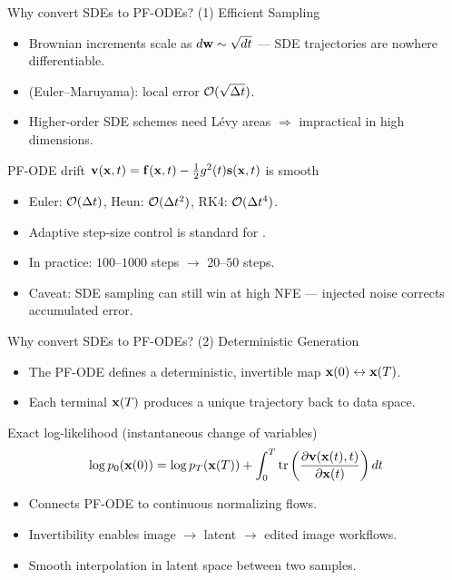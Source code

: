 \documentclass{beamer}
\begin{document}
\begin{frame}{Why convert SDEs to PF-ODEs? (1) Efficient Sampling}
	\begin{itemize}
		\item Brownian increments scale as $d\mathbf{w} \sim \sqrt{dt}$ — SDE trajectories are nowhere differentiable.
		\item \SDESolve (Euler–Maruyama): local error $\mathcal{O}(\sqrt{\Delta t})$.
		\item Higher-order SDE schemes need Lévy areas $\Rightarrow$ impractical in high dimensions.
	\end{itemize}
	\eqpause
	\begin{block}{PF-ODE drift $\mathbf{v}(\mathbf{x}, t) = \mathbf{f}(\mathbf{x}, t) - \frac{1}{2} g^2(t) \mathbf{s}(\mathbf{x}, t)$ is smooth}
		\begin{itemize}
			\item Euler: $\mathcal{O}(\Delta t)$, \quad Heun: $\mathcal{O}(\Delta t^2)$, \quad RK4: $\mathcal{O}(\Delta t^4)$.
			\item Adaptive step-size control is standard for \ODESolve.
		\end{itemize}
	\end{block}
	\eqpause
	\begin{itemize}
		\item In practice: $100$--$1000$ \SDESolve steps $\to$ $20$--$50$ \ODESolve steps.
		\item Caveat: SDE sampling can still win at high NFE — injected noise corrects accumulated error.
	\end{itemize}
\end{frame}
\begin{frame}{Why convert SDEs to PF-ODEs? (2) Deterministic Generation}
	\begin{itemize}
		\item The PF-ODE defines a deterministic, invertible map $\mathbf{x}(0) \leftrightarrow \mathbf{x}(T)$.
		\item Each terminal $\mathbf{x}(T)$ produces a unique trajectory back to data space.
	\end{itemize}
	\eqpause
	\begin{block}{Exact log-likelihood (instantaneous change of variables)}
		\vspace{-0.3cm}
		\[
			\log p_0(\mathbf{x}(0)) = \log p_T(\mathbf{x}(T)) + \int_0^T \operatorname{tr}\left(\frac{\partial \mathbf{v}(\mathbf{x}(t), t)}{\partial \mathbf{x}(t)}\right) dt
		\]
	\end{block}
	\eqpause
	\begin{itemize}
		\item Connects PF-ODE to continuous normalizing flows.
		\item Invertibility enables image $\to$ latent $\to$ edited image workflows.
		\item Smooth interpolation in latent space between two samples.
	\end{itemize}
\end{frame}
\end{document}
